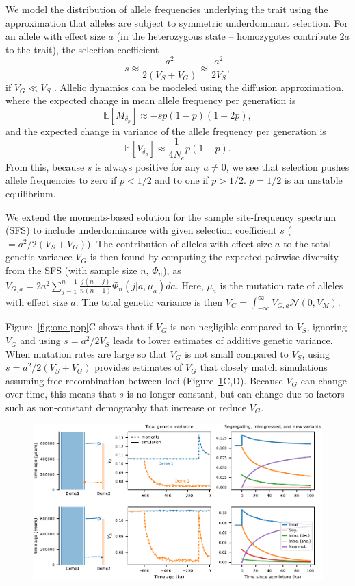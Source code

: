 \documentclass{article}
\newcommand{\E}{\mathbb{E}}
\begin{document}
We model the distribution of allele frequencies underlying the trait using
the approximation that alleles are subject to symmetric underdominant selection.
For an allele with effect size $a$ (in the heterozygous state -- homozygotes
contribute $2a$ to the trait), the selection coefficient
\[s\approx \frac{a^2}{2(V_S + V_G)} \approx \frac{a^2}{2V_S},\]
if $V_G \ll V_S$ \citep[e.g.,][]{simons2018population}. Allelic dynamics can
be modeled using the diffusion approximation, where the expected change
in mean allele frequency per generation is
\[\E[M_{\delta_p}] \approx -s p(1-p)(1-2p),\]
and the expected change in variance of the allele frequency per generation is
\[\E[V_{\delta_p}] \approx \frac{1}{4N_e}p(1-p).\]
From this, because $s$ is always positive for any $a\not=0$, we see that
selection pushes allele frequencies to zero if $p<1/2$ and to one if $p>1/2$.
$p=1/2$ is an unstable equilibrium.

We extend the moments-based solution for the sample site-frequency spectrum
(SFS) \citep{jouganous2017} to include underdominance with given selection
coefficient $s$ (\(=a^2/2(V_S+V_G)\)). The contribution of alleles with effect
size $a$ to the total genetic variance $V_G$ is then found by computing the
expected pairwise diversity from the SFS (with sample size $n$, $\Phi_n$), as
\(V_{G,a} = 2a^2\sum_{j=1}^{n-1}\frac{j(n-j)}{n(n-1)}\Phi_n(j|a,\mu_a)da\).
Here, $\mu_a$ is the mutation rate of alleles with effect size $a$. The total
genetic variance is then \(V_G=\int_{-\infty}^\infty V_{G,a}
\mathcal{N}(0,V_M).\)

Figure~\ref{fig:one-pop}C shows that if $V_G$ is non-negligible compared to
$V_S$, ignoring $V_G$ and using $s=a^2/2V_S$ leads to lower estimates of
additive genetic variance. When mutation rates are large so that $V_G$ is not
small compared to $V_S$, using $s=a^2/2(V_S+V_G)$ provides estimates of $V_G$
that closely match simulations assuming free recombination between loci
(Figure~\ref{fig:toy-admixture}C,D). Because $V_G$ can change over time, this
means that $s$ is no longer constant, but can change due to factors such as
non-constant demography that increase or reduce $V_G$.

\begin{figure}[tb!]
    \centering
    \includegraphics{../figures/reciprocal_admixture.pdf}
    \caption{
        \textbf{}
    }
    \label{fig:toy-admixture}
\end{figure}
\end{document}
